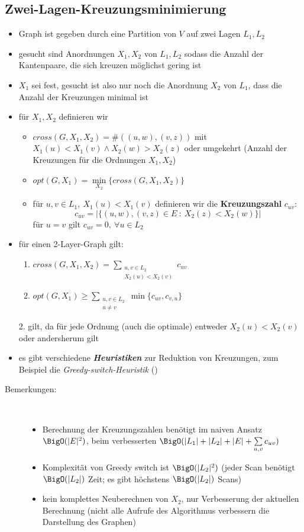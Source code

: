 \subsection{Zwei-Lagen-Kreuzungsminimierung}
\begin{itemize}[itemsep=-1pt]
	\item Graph ist gegeben durch eine Partition von $V$ auf zwei Lagen $L_1,L_2$
	\item gesucht sind Anordnungen $X_1,X_2$ von $L_1,L_2$ sodass die Anzahl der Kantenpaare, die sich kreuzen möglichst gering ist
	\item $X_1$ sei fest, gesucht ist also nur noch die Anordnung $X_2$ von $L_1$, dass die Anzahl der Kreuzungen minimal ist
	\item für $X_1,X_2$ definieren wir
		\begin{itemize}
			\item $cross(G,X_1,X_2)=\# ((u,w),(v,z))$ mit $X_1(u)<X_1(v) \wedge X_2(w)>X_2(z)$ oder umgekehrt (Anzahl der Kreuzungen für die Ordnungen $X_1,X_2$)
			\item $opt(G,X_1)=\min\limits_{X_2}\{cross(G,X_1,X_2)\}$
			\item für $u,v\in L_1,~X_1(u)<X_1(v)$ definieren wir die \textbf{Kreuzungszahl} $c_{uv}$:
				\[c_{uv}=|\{(u,w),(v,z)\in E~:~X_2(z)<X_2(w)\}|\]
				für $u=v$ gilt $c_{uv}=0,~\forall u\in L_2$
		\end{itemize}
	\item für einen 2-Layer-Graph gilt:
		\begin{enumerate}[itemsep=-1pt]
			\item $cross(G,X_1,X_2)=\sum\limits_{\substack{u,v\in L_2\\X_2(u)<X_2(v)}} c_{uv}$
			\item $opt(G,X_1)\geq \sum\limits_{\substack{u,v\in L_2\\u\neq v}}\min\{c_{uv},c_{v,u}\}$
		\end{enumerate}
		2. gilt, da für jede Ordnung (auch die optimale) entweder $X_2(u)<X_2(v)$ oder andersherum gilt
	\item es gibt verschiedene \textit{\textbf{Heuristiken}} zur Reduktion von Kreuzungen, zum Beispiel die \textit{Greedy-switch-Heuristik} ()
\end{itemize}
\begin{description}
	\item[Bemerkungen:]\ \\\vspace*{-\baselineskip}
		\begin{itemize}[itemsep=-1pt]
			\item Berechnung der Kreuzungszahlen benötigt im naiven Ansatz $\BigO(|E|^2)$, beim verbesserten $\BigO(|L_1|+|L_2|+|E|+\sum\limits_{u,v} c_{uv})$
			\item Komplexität von Greedy switch ist $\BigO(|L_2|^2)$ (jeder Scan benötigt $\BigO(|L_2|)$ Zeit; es gibt höchstens $\BigO(|L_2|)$ Scans)
			\item kein komplettes Neuberechnen von $X_2$, nur Verbesserung der aktuellen Berechnung (nicht alle Aufrufe des Algorithmus verbessern die Darstellung des Graphen)
		\end{itemize}
\end{description}
